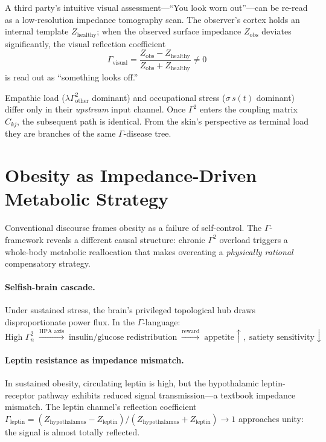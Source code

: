 \documentclass[aps,pre,twocolumn,superscriptaddress,floatfix]{revtex4-2}
\begin{document}
A third party's intuitive visual assessment---``You
look worn out''---can be re-read as a low-resolution
impedance tomography scan.
The observer's cortex holds an internal template
$Z_{\text{healthy}}$; when the observed surface
impedance $Z_{\text{obs}}$ deviates significantly,
the visual reflection coefficient
\begin{equation}
  \Gamma_{\text{visual}}
  = \frac{Z_{\text{obs}} - Z_{\text{healthy}}}
         {Z_{\text{obs}} + Z_{\text{healthy}}}
  \neq 0
  \label{eq:visual-gamma}
\end{equation}
is read out as ``something looks off.''

\begin{remark}
\label{rem:downstream-convergence}
Empathic load
($\lambda\Gamma^2_{\text{other}}$ dominant)
and occupational stress ($\sigma\,s(t)$ dominant)
differ only in their \emph{upstream} input channel.
Once $\Gamma^2$ enters the coupling matrix $C_{kj}$,
the subsequent path is identical.
From the skin's perspective as terminal load they
are branches of the same $\Gamma$-disease tree.
\end{remark}


\section{Obesity as Impedance-Driven Metabolic
  Strategy}
\label{sec:obesity}

Conventional discourse frames obesity as a failure
of self-control.
The $\Gamma$-framework reveals a different causal
structure: chronic $\Gamma^2$ overload triggers a
whole-body metabolic reallocation that makes
overeating a \emph{physically rational}
compensatory strategy.

\paragraph{Selfish-brain cascade.}
Under sustained stress, the brain's privileged
topological hub draws disproportionate power flux.
In the $\Gamma$-language:
\begin{equation}
  \text{High }\Gamma_n^2
  \;\xrightarrow{\text{HPA axis}}\;
  \text{insulin/glucose redistribution}
  \;\xrightarrow{\text{reward}}\;
  \text{appetite}\!\uparrow,\;
  \text{satiety sensitivity}\!\downarrow
  \label{eq:selfish-brain}
\end{equation}

\paragraph{Leptin resistance as impedance mismatch.}
In sustained obesity, circulating leptin is high,
but the hypothalamic leptin-receptor pathway exhibits
reduced signal transmission---a textbook impedance
mismatch.
The leptin channel's reflection coefficient
$\Gamma_{\text{leptin}}
= (Z_{\text{hypothalamus}} - Z_{\text{leptin}})
  /(Z_{\text{hypothalamus}} + Z_{\text{leptin}})
\to 1$
approaches unity: the signal is almost totally
reflected.
\end{document}
